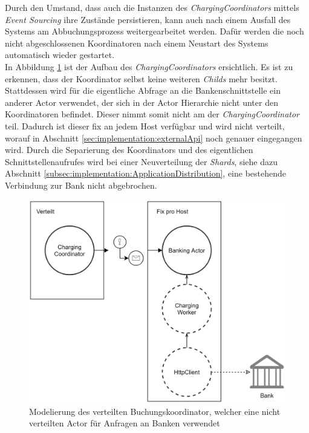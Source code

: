 Durch den Umstand, dass auch die Instanzen des \textit{ChargingCoordinators} mittels \textit{Event Sourcing} ihre Zustände persistieren, kann auch nach einem Ausfall des Systems am Abbuchungsprozess weitergearbeitet werden. Dafür werden die noch nicht abgeschlossenen Koordinatoren nach einem Neustart des Systems automatisch wieder gestartet. \\
In Abbildung \ref{fig:implementation:ChargingCoordinatorSample} ist der Aufbau des \textit{ChargingCoordinators} ersichtlich. Es ist zu erkennen, dass der Koordinator selbst keine weiteren \textit{Childs} mehr besitzt. Stattdessen wird für die eigentliche Abfrage an die Bankenschnittstelle ein anderer Actor verwendet, der sich in der Actor Hierarchie nicht unter den Koordinatoren befindet. Dieser nimmt somit nicht am  der \textit{ChargingCoordinator} teil. Dadurch ist dieser fix an jedem Host verfügbar und wird nicht verteilt, worauf in Abschnitt \ref{sec:implementation:externalApi} noch genauer eingegangen wird. Durch die Separierung des Koordinators und des eigentlichen Schnittstellenaufrufes wird bei einer Neuverteilung der \textit{Shards}, siehe dazu Abschnitt \ref{subsec:implementation:ApplicationDistribution}, eine bestehende Verbindung zur Bank nicht abgebrochen. 
\begin{figure}
    \centering
    \includegraphics[width=0.65\linewidth]{gfx/implementation/ChargingCoordinatorSample}
    \caption{Modelierung des verteilten Buchungskoordinator, welcher eine nicht verteilten Actor für Anfragen an Banken verwendet}
    \label{fig:implementation:ChargingCoordinatorSample}
\end{figure}


